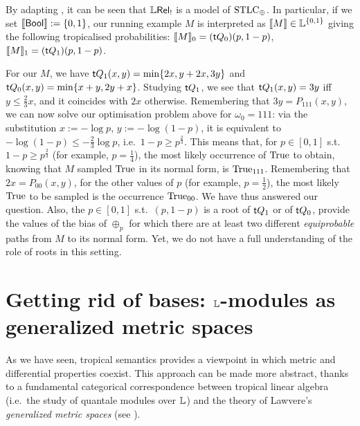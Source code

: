 \documentclass[submission,%
]{eptcs}
\begin{document}
\begin{remark}
 By adapting \cite[Section IV]{Manzo2013}, it can be seen that $\mathbb{L} \mathsf{Rel}_!$ is a model of $\mathrm{STLC}_\oplus$.
 In particular, if we set $\llbracket\mathsf{Bool}\rrbracket:=\{0,1\}$, our running example $M$ is interpreted as $\llbracket M\rrbracket\in\mathbb{L}^{\{0,1\}}$ giving the following tropicalised probabilities: $\llbracket M\rrbracket_0=(\mathsf{t} Q_0)(p,1-p)$, $\llbracket M\rrbracket_1=(\mathsf{t} Q_1)(p,1-p)$.
\end{remark}


For our $M$, we have $\mathsf{t} Q_1(x,y)=\min\{2x,y+2x,3y\}$ and $\mathsf{t} Q_0(x,y)=\min\{x+y,2y+x\}$.
Studying $\mathsf{t} Q_1$, we see that $\mathsf{t} Q_1(x,y)=3y$ iff $y\leq \frac{2}{3}x$, and it coincides with $2x$ otherwise.
Remembering that $3y=P_{111}(x,y)$, we can now solve our optimisation problem above for $\omega_0=111$:
via the substitution $x:=-\log p$, $y:=-\log (1-p)$, it is equivalent to $-\log (1-p)\leq -\frac{2}{3}\log p$, i.e.\ $1-p\geq p^{\frac{2}{3}}$.
This means that, for $p\in[0,1]$ s.t.\ $1-p\geq p^{\frac{2}{3}}$ (for example, $p=\frac{1}{4}$), the most likely occurrence of $\mathrm{True}$ to obtain, knowing that $M$ sampled $\mathrm{True}$ in its normal form, is $\mathrm{True}_{111}$.
Remembering that $2x=P_{00}(x,y)$, for the other values of $p$ (for example, $p=\frac{1}{2}$), the most likely $\mathrm{True}$ to be sampled is the occurrence $\mathrm{True}_{00}$.
We have thus answered our question.
Also, the $p\in[0,1]$ s.t.\ $(p,1-p)$ is a root of $\mathsf{t} Q_1$ or of $\mathsf{t} Q_0$, provide the values of the bias of $\oplus_p$ for which there are at least two different \emph{equiprobable} paths from $M$ to its normal form.
Yet, we do not have a full understanding of the role of roots in this setting.


\section{Getting rid of bases: $\mathbb{L}$-modules as generalized metric spaces}

As we have seen, tropical semantics provides a viewpoint in which metric and differential properties coexist.
This approach can be made more abstract, thanks to a fundamental categorical correspondence between tropical linear algebra (i.e.~the study of quantale modules over $\mathbb{L}$) and the theory of Lawvere's \emph{generalized metric spaces} (see \cite{Fuji, Stubbe2006}).
\end{document}
